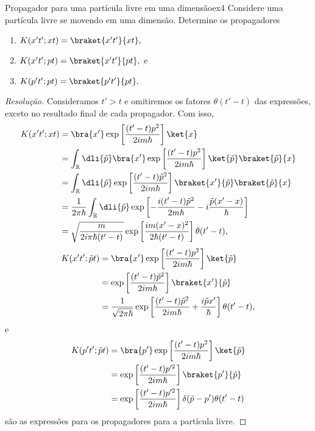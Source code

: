 \begin{exercício}{Propagador para uma partícula livre em uma dimensão}{ex4}
   Considere uma partícula livre se movendo em uma dimensão. Determine os propagadores 
   \begin{enumerate}[label=(\alph*)]
       \item \(K(x't'; xt) = \braket{x't'}{xt},\)
       \item \(K(x't'; pt) = \braket{x't'}{pt},\) e
       \item \(K(p't'; pt) = \braket{p't'}{pt}.\)
   \end{enumerate}
\end{exercício}
\begin{proof}[Resolução]
    Consideramos \(t' > t\) e omitiremos os fatores \(\theta(t' - t)\) das expressões, exceto no resultado final de cada propagador. Com isso,
    \begin{align*}
       K(x't'; xt) &= \bra{x'}\exp\left[\frac{(t' - t) p^2}{2i m \hbar}\right]\ket{x}\\
                   &= \int_{\mathbb{R}} \dli{\tilde{p}} \bra{x'}\exp\left[\frac{(t' - t) p^2}{2i m \hbar}\right]\ket{\tilde{p}}\braket{\tilde{p}}{x}\\
                   &= \int_{\mathbb{R}} \dli{\tilde{p}} \exp\left[\frac{(t' - t) \tilde{p}^2}{2i m \hbar}\right]\braket{x'}{\tilde{p}}\braket{\tilde{p}}{x}\\
                   &= \frac{1}{2\pi \hbar}\int_{\mathbb{R}} \dli{\tilde{p}}\exp\left[-\frac{i(t' - t) \tilde{p}^2}{2m \hbar} -i\frac{\tilde{p}(x' - x)}{\hbar}\right]\\
                   &= \sqrt{\frac{m}{2i\pi \hbar (t'-t)}}\exp\left[\frac{i m (x' - x)^2}{2\hbar(t' - t)}\right]\theta(t' - t),
    \end{align*}
    \begin{align*}
       K(x' t'; \tilde{p} t) &= \bra{x'} \exp\left[\frac{(t' - t) p^2}{2i m \hbar}\right]\ket{\tilde{p}}\\
                             &= \exp\left[\frac{(t' - t)\tilde{p}^2}{2i m \hbar}\right] \braket{x'}{\tilde{p}}\\
                             &= \frac{1}{\sqrt{2 \pi \hbar}} \exp\left[\frac{(t' - t) \tilde{p}^2}{2i m \hbar} + \frac{i \tilde{p} x'}{\hbar}\right] \theta(t' - t),
    \end{align*}
    e
    \begin{align*}
       K(p' t'; \tilde{p} t) &= \bra{p'}\exp\left[\frac{(t' - t) p^2}{2i m \hbar}\right]\ket{\tilde{p}}\\
                             &= \exp\left[\frac{(t' - t) p'^2}{2i m \hbar}\right] \braket{p'}{\tilde{p}}\\
                             &= \exp\left[\frac{(t' - t) p'^2}{2i m \hbar}\right] \delta(\tilde{p} - p') \theta(t' - t)
    \end{align*}
    são as expressões para os propagadores para a partícula livre.
\end{proof}
